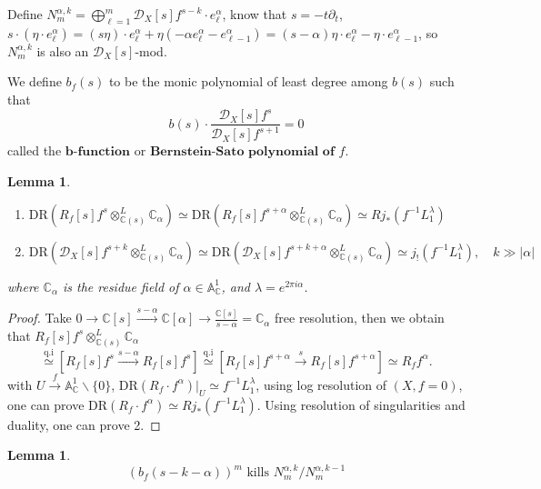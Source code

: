 \documentclass[openany]{book}
\newtheorem{lemma}[theorem]{Lemma}     %
\theoremstyle{definition} %
\theoremstyle{remark}
\begin{document}
Define $N_m^{\alpha,k} = \bigoplus_{\ell=1}^m \mathcal{D}_X[s] f^{s-k} \cdot e_\ell^{\alpha}$, know that $s=-t\partial_{t}$,  $s \cdot (\eta \cdot e_\ell^{\alpha}) = (s\eta) \cdot e_\ell^{\alpha}+\eta(-\alpha e^{\alpha}_{\ell}-e^{\alpha}_{\ell-1})=(s-\alpha)\eta \cdot e^{\alpha}_{\ell}-\eta \cdot e^{\alpha}_{\ell-1}$, so $N_m^{\alpha,k}$ is also an $\mathcal{D}_X[s]$-mod.

We define $b_f(s)$ to be the monic polynomial of least degree among $b(s)$ such that $$b(s) \cdot \frac{\mathcal{D}_X[s] f^s}{\mathcal{D}_X[s] f^{s+1}} = 0$$called the $\textbf{b-function} \text{ or } \textbf{Bernstein-Sato polynomial of }f$.

\begin{lemma}\label{lemma 9.6}
    \quad

    \begin{enumerate}
        \item $\mathrm{DR}\left(R_f[s] f^s \otimes^L_{\mathbb{C}(s)} \mathbb{C}_\alpha\right) \simeq \mathrm{DR}\left(R_f[s] f^{s+\alpha} \otimes^L_{\mathbb{C}(s)} \mathbb{C}_\alpha\right)\simeq R j_* (f^{-1} L_1^\lambda)$
        \item $\mathrm{DR}\left(\mathcal{D}_X[s] f^{s+k} \otimes^{L}_{\mathbb{C}(s)} \mathbb{C}_\alpha\right) \simeq \mathrm{DR}\left(\mathcal{D}_X[s] f^{s+k+\alpha} \otimes^{L}_{\mathbb{C}(s)} \mathbb{C}_\alpha\right)\simeq j_! (f^{-1} L_1^\lambda), \quad k \gg |\alpha|$
    \end{enumerate}
    where $\mathbb{C}_\alpha$ is the residue field of $\alpha \in \mathbb{A}_{\mathbb{C}}^1$, and $\lambda = e^{2\pi i \alpha}$.
\end{lemma}
\begin{proof}
    Take $0\rightarrow \mathbb{C}[s]\xrightarrow{s-\alpha} \mathbb{C}[\alpha]\rightarrow \frac{\mathbb{C}[s]}{s-\alpha}=\mathbb{C}_{\alpha}$ free resolution, then we obtain that $R_f[s]f^s \otimes^L_{\mathbb{C}(s)} \mathbb{C}_\alpha$ $$\stackrel{\text{q.i}}{\simeq}[ R_f[s]f^s \xrightarrow{s-\alpha} R_f[s]f^s ]\stackrel{\text{q.i}}{\simeq}[R_{f}[s]f^{s+\alpha}\xrightarrow{s} R_f[s]f^{s+\alpha}]\simeq R_f f^\alpha.$$with $U\xrightarrow{f}\mathbb{A}^{1}_{\mathbb{C}}\backslash\{0\}$, $\mathrm{DR}(R_f \cdot f^\alpha)|_U \simeq f^{-1} L_1^\lambda$, using log resolution of $(X,f=0)$, one can prove $\mathrm{DR}(R_f \cdot f^\alpha) \simeq R j_*(f^{-1} L_1^\lambda)$.
    Using resolution of singularities and duality, one can prove 2.

\end{proof}
\begin{lemma} \label{lemma 9.7}
    $$(b_f(s-k-\alpha))^m \text{ kills } N_m^{\alpha,k}/N_m^{\alpha,k-1}$$
\end{lemma}
\end{document}
